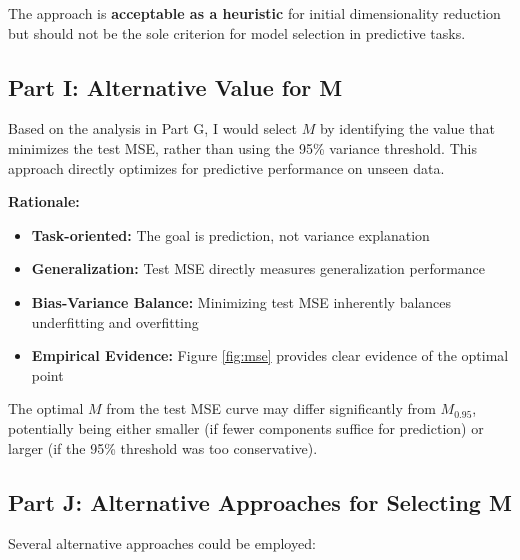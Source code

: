 \documentclass[11pt]{article}
\begin{document}
The approach is \textbf{acceptable as a heuristic} for initial dimensionality reduction but should not be the sole criterion for model selection in predictive tasks.

\subsection{Part I: Alternative Value for M}
Based on the analysis in Part G, I would select $M$ by identifying the value that minimizes the test MSE, rather than using the 95\% variance threshold. This approach directly optimizes for predictive performance on unseen data.

\textbf{Rationale:}
\begin{itemize}
    \item \textbf{Task-oriented:} The goal is prediction, not variance explanation
    \item \textbf{Generalization:} Test MSE directly measures generalization performance
    \item \textbf{Bias-Variance Balance:} Minimizing test MSE inherently balances underfitting and overfitting
    \item \textbf{Empirical Evidence:} Figure \ref{fig:mse} provides clear evidence of the optimal point
\end{itemize}

The optimal $M$ from the test MSE curve may differ significantly from $M_{0.95}$, potentially being either smaller (if fewer components suffice for prediction) or larger (if the 95\% threshold was too conservative).

\subsection{Part J: Alternative Approaches for Selecting M}

Several alternative approaches could be employed:
\end{document}
